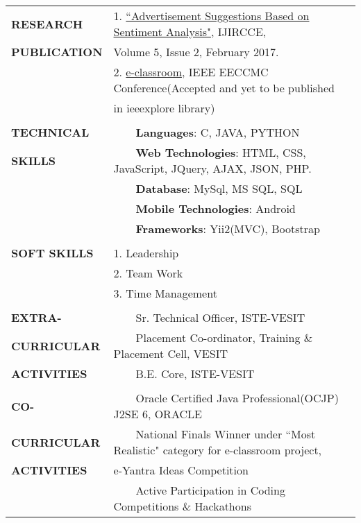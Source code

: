 \documentclass[letterpaper,11pt,oneside]{article}
\newcommand{\tabitem}{~~\llap{\textbullet}~~}
\begin{document}
	\newpage
	
	
	\noindent \begin{tabular}{@{} l l}
		\textbf{RESEARCH}    &1. \href{http://www.ijircce.com/upload/2017/february/44_6_Advertisement.pdf}{``Advertisement Suggestions Based on Sentiment Analysis"}, IJIRCCE,\\ 	
		\textbf{PUBLICATION}    & \hspace{0.3cm} Volume 5, Issue 2, February 2017. \\ 
		&2. \href{http://eeccmc.org/acceptance.php}{e-classroom},  IEEE EECCMC Conference(Accepted and yet to be published \\ & \hspace{0.3cm} in ieeexplore library)
		\\
		& \\
		\textbf{TECHNICAL}    & \tabitem \textbf{Languages}: C, JAVA, PYTHON\\
		\textbf{SKILLS}    & \tabitem \textbf{Web Technologies}: HTML, CSS, JavaScript, JQuery, AJAX, JSON, PHP. \\
		&\tabitem \textbf{Database}: MySql, MS SQL, SQL\\
		&\tabitem \textbf{Mobile Technologies}: Android\\
		&\tabitem \textbf{Frameworks}: Yii2(MVC), Bootstrap\\
		& \\
		\textbf{SOFT SKILLS}    &1. Leadership\\ 	 &2. Team Work \\ 
		&3. Time Management
		\\
		& \\
		\textbf{EXTRA-}    & \tabitem Sr. Technical Officer, ISTE-VESIT\\
		\textbf{CURRICULAR}    & \tabitem Placement Co-ordinator, Training \& Placement Cell, VESIT\\
		\textbf{ACTIVITIES}    & \tabitem B.E. Core, ISTE-VESIT \\
		& \\
		\textbf{CO-}    & \tabitem Oracle Certified Java Professional(OCJP) J2SE 6, ORACLE\\
		\textbf{CURRICULAR}    & \tabitem  National Finals Winner under ``Most Realistic" category for e-classroom project,\\
		\textbf{ACTIVITIES}    & \hspace{0.4cm} e-Yantra Ideas Competition\\
		& \tabitem 	Active Participation in Coding Competitions \& Hackathons
		\\	

\end{tabular}
\end{document}

